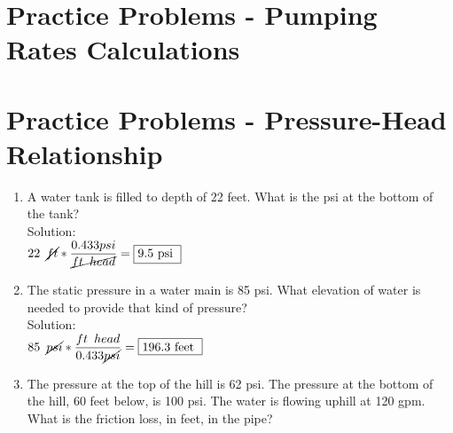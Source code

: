 \section*{Practice Problems - Pumping Rates Calculations}



\section*{Practice Problems - Pressure-Head Relationship}
\begin{enumerate}
\item A water tank is filled to depth of 22 feet. What is the psi at the bottom of the tank?\\
 \vspace{0.2cm}
Solution:\\ 
 \vspace{0.2cm}
$
22 \enspace \cancel{ft}*\dfrac{0.433psi}{\cancel{ft \enspace head}}=\boxed{9.5 \text { psi }}
$
  \vspace{0.2cm}
\item The static pressure in a water main is 85 psi. What elevation of water is needed to provide that kind of pressure?\\
 \vspace{0.2cm}
Solution:\\ 
 \vspace{0.2cm}
$
85 \enspace \cancel{psi}*\dfrac{ft \enspace head}{0.433\cancel{psi}}=\boxed{196.3 \text { feet }}
$
 
 \vspace{0.2cm}

\item The pressure at the top of the hill is 62 psi. The pressure at the bottom of the hill, 60 feet below, is 100 psi. The water is flowing uphill at 120 gpm. What is the friction loss, in feet, in the pipe?\\
\vspace{0.2cm}
\end{enumerate}
